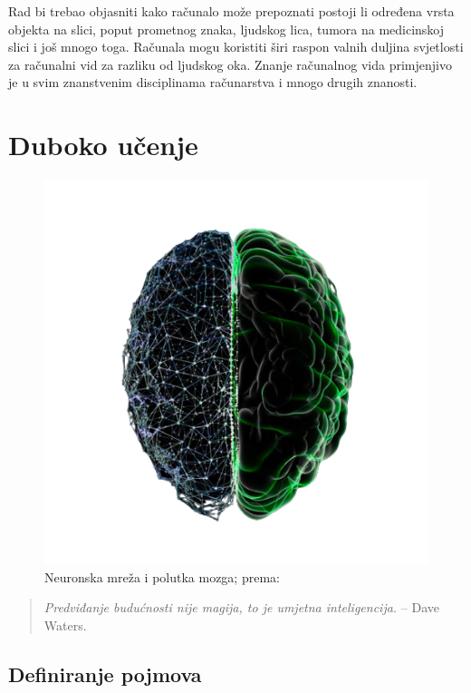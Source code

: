 \documentclass[]{foi} %
\begin{document}
Rad bi trebao objasniti kako računalo može prepoznati postoji li određena vrsta objekta na slici, poput prometnog znaka, ljudskog lica, tumora na medicinskoj slici i još mnogo toga.
Računala mogu koristiti širi raspon valnih duljina svjetlosti za računalni vid za razliku od ljudskog oka. Znanje računalnog vida primjenjivo je u svim znanstvenim disciplinama računarstva i mnogo drugih znanosti.

\chapter{Duboko učenje}

\hspace{20 mm}

\begin{figure}[!ht]
    \centering
    \includegraphics[width=1\textwidth]{slike/mozak.png}
    \caption{Neuronska mreža i polutka mozga; prema: \cite{deep}}
    \label{fig:struce}
\end{figure}

\hspace{20 mm}

\blockquote[{\cite{deep}}]{\textit{Predviđanje budućnosti nije magija, to je umjetna inteligencija.} -- Dave Waters.}

\newpage
\section{Definiranje pojmova}
\end{document}

